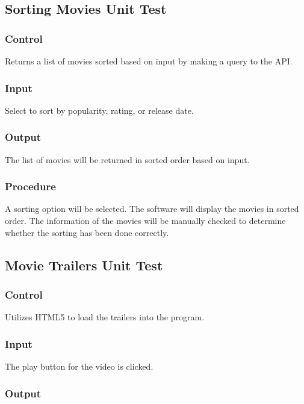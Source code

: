 \documentclass[12pt, titlepage]{article}
\begin{document}
\subsection{Sorting Movies Unit Test}
\subsubsection{Control}

Returns a list of movies sorted based on input by making a query to the API. 

\subsubsection{Input}

Select to sort by popularity, rating, or release date. 

\subsubsection{Output}

The list of movies will be returned in sorted order based on input. 

\subsubsection{Procedure}

A sorting option will be selected. The software will display the movies in sorted order. The information of the movies will be manually checked to determine whether the sorting has been done correctly. 

\subsection{Movie Trailers Unit Test}
\subsubsection{Control}

Utilizes HTML5 to load the trailers into the program.  

\subsubsection{Input}

The play button for the video is clicked.

\subsubsection{Output}
\end{document}
